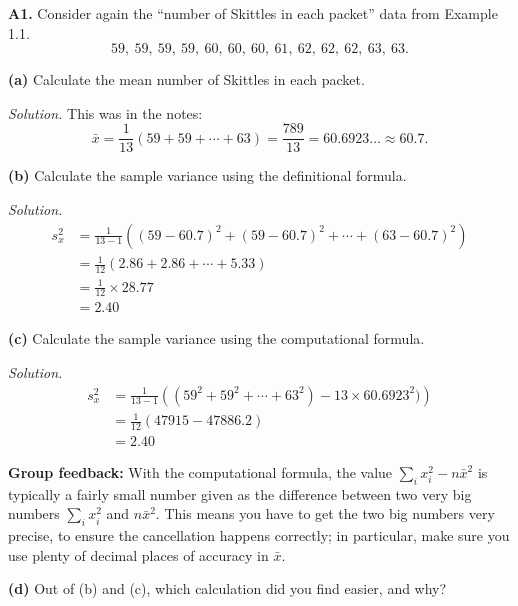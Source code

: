 \documentclass[
  a4paper,
]{book}
\theoremstyle{definition}
\theoremstyle{definition}
\theoremstyle{definition}
\theoremstyle{definition}
\theoremstyle{remark}
\begin{document}
\textbf{A1.} Consider again the ``number of Skittles in each packet'' data from Example 1.1.
\[ 59, \ 59, \ 59, \ 59, \ 60, \ 60, \ 60, \ 61, \ 62, \ 62, \ 62, \ 63, \ 63 .\]

\textbf{(a)} Calculate the mean number of Skittles in each packet.

\begin{myanswers}
\emph{Solution.} This was in the notes:
\[ \bar x = \frac{1}{13} (59 + 59 + \cdots + 63) =  \frac{789}{13} = 60.6923\dots \approx 60.7 .\]

\end{myanswers}

\textbf{(b)} Calculate the sample variance using the definitional
formula.

\begin{myanswers}
\emph{Solution.}
\begin{align*}
s_x^2 &= \frac{1}{13 - 1} \left( (59 - 60.7)^2 + (59 - 60.7)^2 + \cdots + (63 - 60.7)^2 \right) \\
      &= \frac{1}{12} (2.86 + 2.86 + \cdots + 5.33) \\
      &= \frac{1}{12} \times 28.77 \\
      &= 2.40
\end{align*}

\end{myanswers}

\textbf{(c)} Calculate the sample variance using the computational formula.

\begin{myanswers}
\emph{Solution.}
\begin{align*}
s_x^2 &= \frac{1}{13 - 1} \left( (59^2 + 59^2 + \cdots + 63^2) - 13 \times 60.6923^2)\right) \\
      &= \frac{1}{12} (47915 - 47886.2) \\
      &= 2.40
\end{align*}

\textbf{Group feedback:} With the computational formula, the value \(\sum_i x_i^2 - n \bar{x}^2\) is typically a fairly small number given as the difference between two very big numbers \(\sum_i x_i^2\) and \(n \bar x^2\). This means you have to get the two big numbers very precise, to ensure the cancellation happens correctly; in particular, make sure you use plenty of decimal places of accuracy in \(\bar x\).

\end{myanswers}

\textbf{(d)} Out of (b) and (c), which calculation did you find easier, and why?
\end{document}

